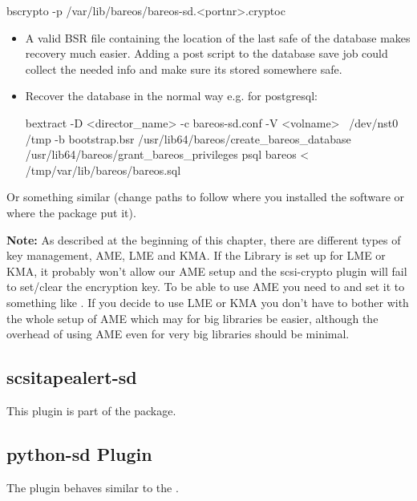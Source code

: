 \begin{commands}{}
bscrypto -p /var/lib/bareos/bareos-sd.<portnr>.cryptoc
\end{commands}

\begin{itemize}
 \item A valid BSR file containing the location of the last safe of the database makes recovery much easier. Adding a post script to the database save job could collect the needed info and make sure its stored somewhere safe.
 \item Recover the database in the normal way e.g. for postgresql:
\begin{commands}{}
bextract -D <director_name> -c bareos-sd.conf -V <volname> \ /dev/nst0 /tmp -b bootstrap.bsr
/usr/lib64/bareos/create_bareos_database
/usr/lib64/bareos/grant_bareos_privileges
psql bareos < /tmp/var/lib/bareos/bareos.sql
\end{commands}
\end{itemize}

Or something similar (change paths to follow where you installed the software or where the package put it).

\textbf{Note:} As described at the beginning of this chapter, there are different types of key management, AME, LME and KMA. If the Library is set up for LME or KMA, it probably won't allow our AME setup and the scsi-crypto plugin will fail to set/clear the encryption key. To be able to use AME you need to  and set it to something like .
If you decide to use LME or KMA you don't have to bother with the whole setup of AME which may for big libraries be easier, although the overhead of using AME even for very big libraries should be minimal.

\subsection{scsitapealert-sd}

This plugin is part of the  package.


\subsection{python-sd Plugin}

The  plugin behaves similar to the .


